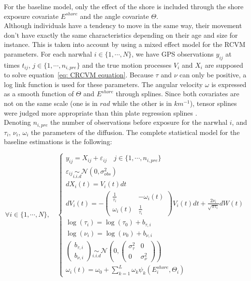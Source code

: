\documentclass[11pt]{article}
\newcommand {\1}{\mathbb{1}}
\theoremstyle{definition}
\theoremstyle{remark}
\theoremstyle{remark}
\begin{document}
For the baseline model, only the effect of the shore is included through the shore exposure covariate $E^{shore}$ and the angle covariate $\Theta$.\\
Although individuals have a tendency to move in the same way, their movement don't have exactly the same characteristics depending on their age and size for instance. This is taken into account by using a mixed effect model for the RCVM parameters.
For each narwhal $i \in \{1, \cdots, N\}$, we have 	GPS observations $y_{ij}$ at times $t_{ij}$, $j \in \{1,\cdots,n_{i,pre}\}$ and the true motion processes $V_i$ and $X_i$ are supposed to solve equation~\ref{eq: CRCVM equation}. Because $\tau$ and $\nu$ can only be positive, a log link function is used for these parameters. The angular velocity $\omega$ is expressed as a smooth function of $\Theta$ and $E^{shore}$ through splines. Since both covariates are not on the same scale (one is in $rad$ while the other is in $km^{-1}$), tensor splines were judged more appropriate than thin plate regression splines \cite{wood_generalized_2017}.\\

Denoting $n_{i,pre}$ the number of observations before exposure for the narwhal $i$, and $\tau_i$, $\nu_i$, $\omega_i$ the parameters of the diffusion. The complete statistical model for the baseline estimations is the following:

\begin{equation}  \forall i \in \{1,\cdots,N\}, \quad \left\{
	\begin{array}{l}
		y_{ij}=X_{ij}+\varepsilon_{ij} \quad j \in \{1,\cdots,n_{i,pre}\}\\
		\varepsilon_{ij} \underset{i.i.d}{\sim} \mathcal{N}(0,\sigma_{obs}^2)  \\
		dX_i(t)=V_i(t)dt  \\
		dV_i(t)=-\begin{pmatrix} 
			\frac{1}{\tau_i} & -\omega_i(t) \\
			\omega_i(t) & \frac{1}{\tau_i}
		\end{pmatrix}V_i(t)dt+\frac{2\nu_i}{\sqrt{\pi \tau_i}} dW(t) \\
		\log(\tau_i)=\log(\tau_0)+b_{\tau,i}\\
		\log(\nu_i)=\log(\nu_0)+b_{\nu,i}  \\
		\begin{pmatrix} b_{\tau,i} \\ b_{\nu,i} \end{pmatrix} \underset{i.i.d}{\sim} \mathcal{N}\left(0,\begin{pmatrix} \sigma_{\tau}^2 & 0 \\ 0 & \sigma_{\nu}^2 \end{pmatrix}\right) \\
		\omega_i(t)=\omega_{0}+\sum_{k=1}^{L} \omega_{k} \psi_k(E_i^{shore},\Theta_i)
	\end{array}
	\right.
	\label{eq: exact baseline model}
\end{equation}
\end{document}
